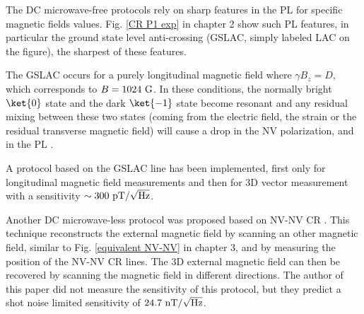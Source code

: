 \documentclass[a4paper, 11pt]{report}
\begin{document}

The DC microwave-free protocols rely on sharp features in the PL for specific magnetic fields values. Fig. \ref{CR P1 exp} in chapter 2 show such PL features, in particular the ground state level anti-crossing (GSLAC, simply labeled LAC on the figure), the sharpest of these features.

The GSLAC occurs for a purely longitudinal magnetic field where $\gamma B_z = D$, which corresponds to $B=1024\ \rm G$. In these conditions, the normally bright $\ket{0}$ state and the dark $\ket{-1}$ state become resonant and any residual mixing between these two states (coming from the electric field, the strain or the residual transverse magnetic field) will cause a drop in the NV polarization, and in the PL \citep{broadway2016anticrossing}. 

A protocol based on the GSLAC line has been implemented, first only for longitudinal magnetic field measurements \citep{wickenbrock2016microwave} and then for 3D vector measurement \citep{zheng2020microwave} with a sensitivity $\sim 300\ \rm pT/\sqrt{\rm Hz}$.

Another DC microwave-less protocol was proposed based on NV-NV CR \citep{akhmedzhanov2017microwave, akhmedzhanov2019magnetometry}. This technique reconstructs the external magnetic field by scanning an other magnetic field, similar to Fig. \ref{equivalent NV-NV} in chapter 3, and by measuring the position of the NV-NV CR lines. The 3D external magnetic field can then be recovered by scanning the magnetic field in different directions. The author of this paper did not measure the sensitivity of this protocol, but they predict a shot noise limited sensitivity of $24.7\ \rm nT/\sqrt{\rm Hz}$.

%
\end{document}

